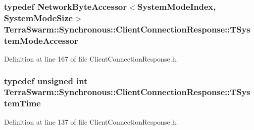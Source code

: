 \hypertarget{class_terra_swarm_1_1_synchronous_1_1_client_connection_response_a241ee2024d2b124e89185884213650c2}{
\subsubsection[{T\-System\-Mode\-Accessor}]{\setlength{\rightskip}{0pt plus 5cm}typedef {\bf Network\-Byte\-Accessor}$<${\bf System\-Mode\-Index}, {\bf System\-Mode\-Size}$>$ {\bf Terra\-Swarm\-::\-Synchronous\-::\-Client\-Connection\-Response\-::\-T\-System\-Mode\-Accessor}\hspace{0.3cm}{\ttfamily [private]}}}\label{class_terra_swarm_1_1_synchronous_1_1_client_connection_response_a241ee2024d2b124e89185884213650c2}


Definition at line 167 of file Client\-Connection\-Response.\-h.

\hypertarget{class_terra_swarm_1_1_synchronous_1_1_client_connection_response_a7b389f7e89631ce7c758c3a26c46c303}{
\subsubsection[{T\-System\-Time}]{\setlength{\rightskip}{0pt plus 5cm}typedef unsigned int {\bf Terra\-Swarm\-::\-Synchronous\-::\-Client\-Connection\-Response\-::\-T\-System\-Time}}}\label{class_terra_swarm_1_1_synchronous_1_1_client_connection_response_a7b389f7e89631ce7c758c3a26c46c303}


Definition at line 137 of file Client\-Connection\-Response.\-h.

